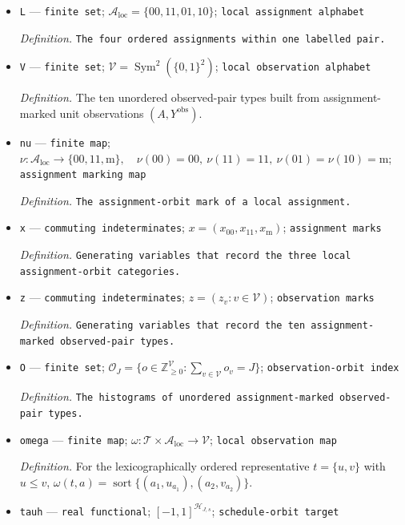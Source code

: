 \documentclass{article}
\begin{document}
\begin{itemize}
  \item \texttt{L} --- \texttt{finite set}; \(\mathcal A_{\mathrm{loc}}=\{00,11,01,10\}\); \texttt{local assignment alphabet}
  \par\smallskip\noindent\emph{Definition.} \texttt{The four ordered assignments within one labelled pair.}
  \item \texttt{V} --- \texttt{finite set}; \(\mathcal V=\operatorname{Sym}^2(\{0,1\}^2)\); \texttt{local observation alphabet}
  \par\smallskip\noindent\emph{Definition.} The ten unordered observed-pair types built from assignment-marked unit observations \((A,Y^{\mathrm{obs}})\).
  \item \texttt{nu} --- \texttt{finite map}; \(\nu:\mathcal A_{\mathrm{loc}}\to\{00,11,\mathrm m\},\quad \nu(00)=00,\ \nu(11)=11,\ \nu(01)=\nu(10)=\mathrm m\); \texttt{assignment marking map}
  \par\smallskip\noindent\emph{Definition.} \texttt{The assignment-\allowbreak{}orbit mark of a local assignment.}
  \item \texttt{x} --- \texttt{commuting indeterminates}; \(x=(x_{00},x_{11},x_{\mathrm m})\); \texttt{assignment marks}
  \par\smallskip\noindent\emph{Definition.} \texttt{Generating variables that record the three local assignment-\allowbreak{}orbit categories.}
  \item \texttt{z} --- \texttt{commuting indeterminates}; \(z=(z_v:v\in\mathcal V)\); \texttt{observation marks}
  \par\smallskip\noindent\emph{Definition.} \texttt{Generating variables that record the ten assignment-\allowbreak{}marked observed-\allowbreak{}pair types.}
  \item \texttt{O} --- \texttt{finite set}; \(\mathcal O_J=\{o\in\mathbb Z_{\ge0}^{\mathcal V}:\sum_{v\in\mathcal V}o_v=J\}\); \texttt{observation-\allowbreak{}orbit index}
  \par\smallskip\noindent\emph{Definition.} \texttt{The histograms of unordered assignment-\allowbreak{}marked observed-\allowbreak{}pair types.}
  \item \texttt{omega} --- \texttt{finite map}; \(\omega:\mathcal T\times\mathcal A_{\mathrm{loc}}\to\mathcal V\); \texttt{local observation map}
  \par\smallskip\noindent\emph{Definition.} For the lexicographically ordered representative \(t=\{u,v\}\) with \(u\le v\), \(\omega(t,a)=\operatorname{sort}\{(a_1,u_{a_1}),(a_2,v_{a_2})\}\).
  \item \texttt{tauh} --- \texttt{real functional}; \([-1,1]^{\mathcal H_{J,s}}\); \texttt{schedule-\allowbreak{}orbit target}

\end{itemize}
\end{document}
